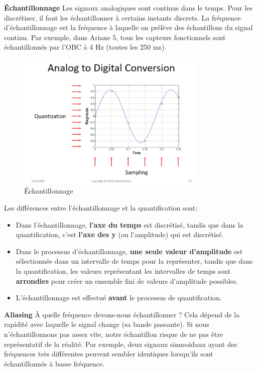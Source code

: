 \textbf{Échantillonnage}
Les signaux analogiques sont continus dans le temps. Pour les discrétiser, il faut les échantillonner à certains instants discrets. La fréquence d'échantillonnage est la fréquence à laquelle on prélève des échantillons du signal continu. Par exemple, dans Ariane 5, tous les capteurs fonctionnels sont échantillonnés par l'OBC à 4 Hz (toutes les 250 ms).
\begin{figure}[H] %
    \centering
    \includegraphics[width=0.8\textwidth]{figures/6-17.jpg}
        \caption{Échantillonnage}
    \label{fig:communication2}
\end{figure}
Les différences entre l'échantillonnage et la quantification sont:
\begin{itemize}
    \item Dans l'échantillonnage, \textbf{l'axe du temps} est discrétisé, tandis que dans la quantification, c'est \textbf{l'axe des y} (ou l'amplitude) qui est discrétisé.
    \item Dans le processus d'échantillonnage, \textbf{une seule valeur d'amplitude} est sélectionnée dans un intervalle de temps pour la représenter, tandis que dans la quantification, les valeurs représentant les intervalles de temps sont \textbf{arrondies} pour créer un ensemble fini de valeurs d'amplitude possibles.
    \item L'échantillonnage est effectué \textbf{avant} le processus de quantification.
\end{itemize}
\textbf{Aliasing}
À quelle fréquence devons-nous échantillonner ? Cela dépend de la rapidité avec laquelle le signal change (sa bande passante). Si nous n'échantillonnons pas assez vite, notre échantillon risque de ne pas être représentatif de la réalité.
Par exemple, deux signaux sinusoïdaux ayant des fréquences très différentes peuvent sembler identiques lorsqu’ils sont échantillonnés à basse fréquence.
